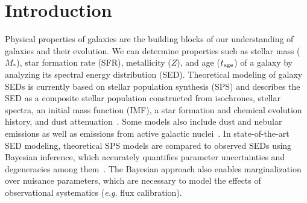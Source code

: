 \section{Introduction} \label{sec:intro} 
Physical properties of galaxies are the building
blocks of our understanding of galaxies and their evolution. 
We can determine properties such as stellar mass ($M_*$), star formation rate (SFR), metallicity
($Z$), and age ($t_{\rm age}$) of a galaxy by analyzing its
spectral energy distribution (SED).
Theoretical modeling of galaxy SEDs is currently based on stellar population
synthesis (SPS) and describes the SED as a composite stellar population
constructed
from isochrones, stellar spectra, an initial mass function (IMF), a star
formation and chemical evolution history, and dust
attenuation~\citep[\emph{e.g.}][see \citealt{walcher2011, conroy2013} for a
comprehensive review]{bruzual2003, maraston2005, conroy2009}.
Some models also include dust and nebular emissions as well as emissions from
active galactic nuclei~\citep[\emph{e.g.}][]{johnson2021}.
In state-of-the-art SED modeling, theoretical SPS models are compared to
observed SEDs using Bayesian inference, which accurately quantifies parameter
uncertainties and degeneracies among them~\citep{acquaviva2011,
chevallard2016, leja2017, carnall2018, johnson2021, hahn2022}. 
The Bayesian approach also enables marginalization over nuisance parameters,
which are necessary to model the effects of observational systematics
(\emph{e.g.} flux calibration).

